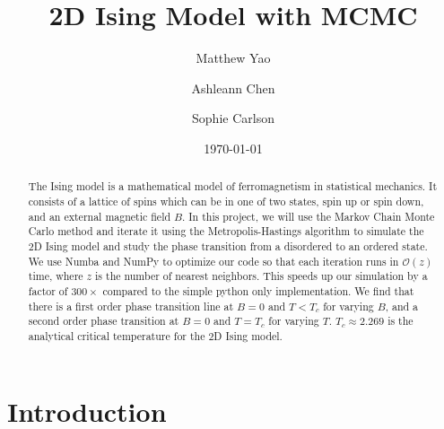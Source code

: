 \documentclass[
 reprint,
 amsmath,
 amssymb,
 aps,
]{revtex4-2}
\begin{document}
\title{2D Ising Model with MCMC}

\author{Matthew Yao}
\author{Ashleann Chen}
\author{Sophie Carlson}



\date{\today}

\begin{abstract}
The Ising model is a mathematical model of ferromagnetism in statistical 
mechanics. 
It consists of a lattice of spins which can be in one of two states,
spin up or spin down, and an external magnetic field $ B $.
In this project, we will use the Markov Chain Monte Carlo method and iterate it using the Metropolis-Hastings algorithm to simulate the
2D Ising model and study the phase transition from a disordered to an 
ordered state.
We use Numba and NumPy to optimize our code so that each iteration
runs in $ \mathcal{O}(z) $ time, where $ z $ is the number of nearest neighbors.
This speeds up our simulation by a factor of $ 300\times $ compared to 
the simple python only implementation.
We find that there is a first order phase transition line at $ B=0 $
and $ T < T_{c} $ for varying $ B $,
and a second order phase transition at $ B=0 $ and $ T = T_{c} $
for varying $ T $.
$ T_{c} \approx 2.269 $ is the analytical critical temperature for the 
2D Ising model.

\end{abstract}

\maketitle


\section{Introduction}
\label{sec:intro}
\end{document}
